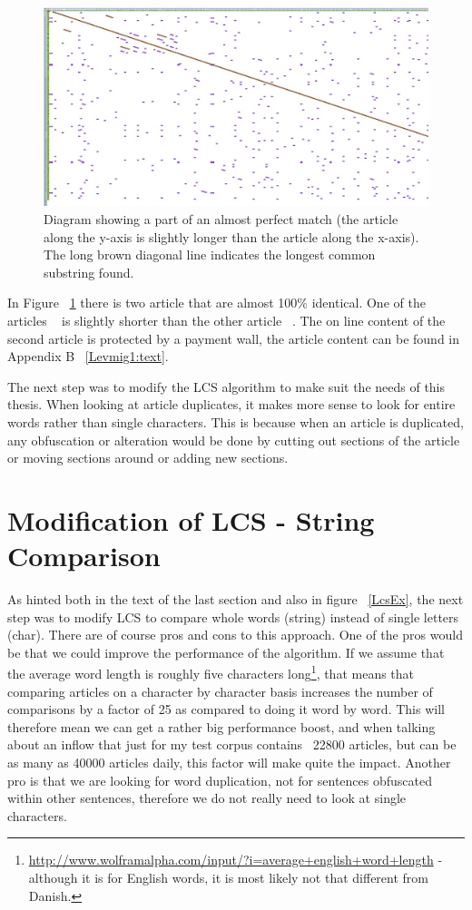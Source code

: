 \begin{figure}
	\centering
	\includegraphics[scale=0.35]{figures/PerfectMatch}
	\caption{Diagram showing a part of an almost perfect match (the article along the y-axis is slightly longer than the article along the x-axis). The long brown diagonal line indicates the longest common substring found.}
	\label{Match}
\end{figure}

In Figure ~\ref{Match} there is two article that are almost 100\% identical. One of the articles ~\cite{JV1} is slightly shorter than the other article ~\cite{Lemvig1}. The on line content of the second article is protected by a payment wall, the article content can be found in Appendix B ~\ref{Levmig1:text}.

The next step was to modify the LCS algorithm to make suit the needs of this thesis. When looking at article duplicates, it makes more sense to look for entire words rather than single characters. This is because when an article is duplicated, any obfuscation or alteration would be done by cutting out sections of the article or moving sections around or adding new sections.

\section{Modification of LCS - String Comparison}
As hinted both in the text of the last section and also in figure ~\ref{LcsEx}, the next step was to modify LCS to compare whole words (string) instead of single letters (char). There are of course pros and cons to this approach. One of the pros would be that we could improve the performance of the algorithm. If we assume that the average word length is roughly five characters long\footnote{\url{http://www.wolframalpha.com/input/?i=average+english+word+length} - although it is for English words, it is most likely not that different from Danish.}, that means that comparing articles on a character by character basis increases the number of comparisons by a factor of 25 as compared to doing it word by word. This will therefore mean we can get a rather big performance boost, and when talking about an inflow that just for my test corpus contains ~22800 articles, but can be as many as 40000 articles daily, this factor will make quite the impact. Another pro is that we are looking for word duplication, not for sentences obfuscated within other sentences, therefore we do not really need to look at single characters.

